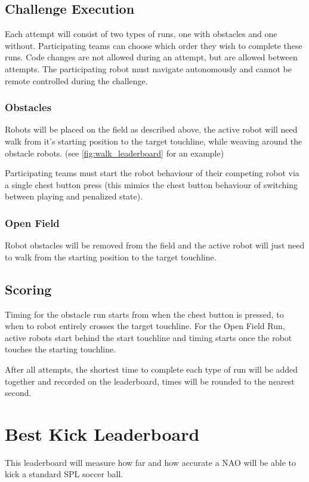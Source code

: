 \subsection{Challenge Execution}
Each attempt will consist of two types of runs, one with obstacles and one without.
Participating teams can choose which order they wish to complete these runs. Code changes are not allowed during an attempt,
but are allowed between attempts. The participating robot must navigate autonomously and cannot be remote controlled during the challenge.

\subsubsection{Obstacles}
Robots will be placed on the field as described above, the active robot will need walk from it's
starting position to the target touchline, while weaving around the obstacle robots. (see \cref{fig:walk_leaderboard} for an example)

Participating teams must start the robot behaviour of their competing robot via a single chest button
press (this mimics the chest button behaviour of switching between playing and penalized state).

\subsubsection{Open Field}
Robot obstacles will be removed from the field and the active robot will just need to walk 
from the starting position to the target touchline.

\subsection{Scoring}
Timing for the obstacle run starts from when the chest button is pressed, to when to robot entirely crosses the target touchline.
For the Open Field Run, active robots start behind the start touchline and timing starts once the robot
touches the starting touchline.

After all attempts, the shortest time to complete each type of run will be added together and recorded
on the leaderboard, times will be rounded to the nearest second.

\section{Best Kick Leaderboard}
This leaderboard will measure how far and how accurate a NAO will be able to kick a standard
SPL soccer ball.


